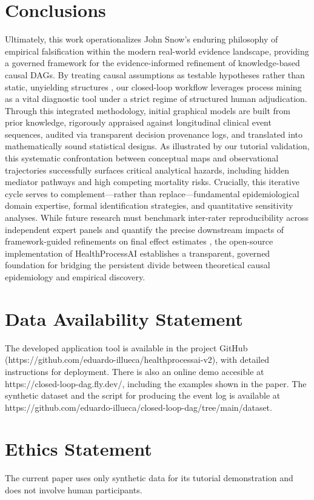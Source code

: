 \documentclass[sn-vancouver-num]{sn-jnl}
\begin{document}
\section{Conclusions}

Ultimately, this work operationalizes John Snow's enduring philosophy of empirical falsification within the modern real-world evidence landscape, providing a governed framework for the evidence-informed refinement of knowledge-based causal DAGs. By treating causal assumptions as testable hypotheses rather than static, unyielding structures , our closed-loop workflow leverages process mining as a vital diagnostic tool under a strict regime of structured human adjudication. Through this integrated methodology, initial graphical models are built from prior knowledge, rigorously appraised against longitudinal clinical event sequences, audited via transparent decision provenance logs, and translated into mathematically sound statistical designs. As illustrated by our tutorial validation, this systematic confrontation between conceptual maps and observational trajectories successfully surfaces critical analytical hazards, including hidden mediator pathways and high competing mortality risks. Crucially, this iterative cycle serves to complement—rather than replace—fundamental epidemiological domain expertise, formal identification strategies, and quantitative sensitivity analyses. While future research must benchmark inter-rater reproducibility across independent expert panels and quantify the precise downstream impacts of framework-guided refinements on final effect estimates , the open-source implementation of HealthProcessAI establishes a transparent, governed foundation for bridging the persistent divide between theoretical causal epidemiology and empirical discovery.

\backmatter

\section*{Data Availability Statement}
The developed application tool is available in the project GitHub (https://github.com/eduardo-illueca/healthprocessai-v2), with detailed instructions for deployment. There is also an online demo accesible at https://closed-loop-dag.fly.dev/, including the examples shown in the paper. The synthetic dataset and the script for producing the event log is available at https://github.com/eduardo-illueca/closed-loop-dag/tree/main/dataset.

\section*{Ethics Statement}
The current paper uses only synthetic data for its tutorial demonstration and does not involve human participants.
\end{document}
